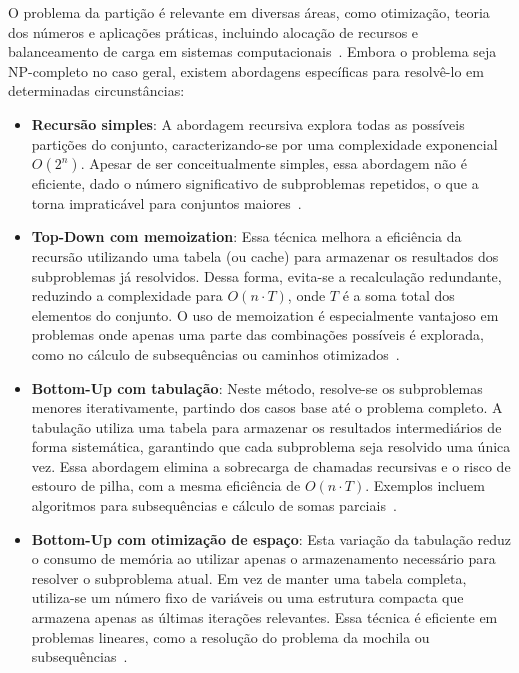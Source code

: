 \documentclass{article}
\begin{document}
O problema da partição é relevante em diversas áreas, como otimização, teoria dos números e aplicações práticas, incluindo alocação de recursos e balanceamento de carga em sistemas computacionais~\cite{martello1981knapsack}. Embora o problema seja NP-completo no caso geral, existem abordagens específicas para resolvê-lo em determinadas circunstâncias:
\begin{itemize}
\item \textbf{Recursão simples}: A abordagem recursiva explora todas as possíveis partições do conjunto, caracterizando-se por uma complexidade exponencial \(O(2^n)\). Apesar de ser conceitualmente simples, essa abordagem não é eficiente, dado o número significativo de subproblemas repetidos, o que a torna impraticável para conjuntos maiores~\cite{cormen2009introduction}.
\item \textbf{Top-Down com memoization}: Essa técnica melhora a eficiência da recursão utilizando uma tabela (ou cache) para armazenar os resultados dos subproblemas já resolvidos. Dessa forma, evita-se a recalculação redundante, reduzindo a complexidade para \(O(n \cdot T)\), onde \(T\) é a soma total dos elementos do conjunto. O uso de memoization é especialmente vantajoso em problemas onde apenas uma parte das combinações possíveis é explorada, como no cálculo de subsequências ou caminhos otimizados~\cite{cormen2009introduction}.

\item \textbf{Bottom-Up com tabulação}: Neste método, resolve-se os subproblemas menores iterativamente, partindo dos casos base até o problema completo. A tabulação utiliza uma tabela para armazenar os resultados intermediários de forma sistemática, garantindo que cada subproblema seja resolvido uma única vez. Essa abordagem elimina a sobrecarga de chamadas recursivas e o risco de estouro de pilha, com a mesma eficiência de \(O(n \cdot T)\). Exemplos incluem algoritmos para subsequências e cálculo de somas parciais~\cite{cormen2009introduction, garey1979computers}.

\item \textbf{Bottom-Up com otimização de espaço}: Esta variação da tabulação reduz o consumo de memória ao utilizar apenas o armazenamento necessário para resolver o subproblema atual. Em vez de manter uma tabela completa, utiliza-se um número fixo de variáveis ou uma estrutura compacta que armazena apenas as últimas iterações relevantes. Essa técnica é eficiente em problemas lineares, como a resolução do problema da mochila ou subsequências~\cite{cormen2009introduction, garey1979computers}.
\end{itemize}
\end{document}
